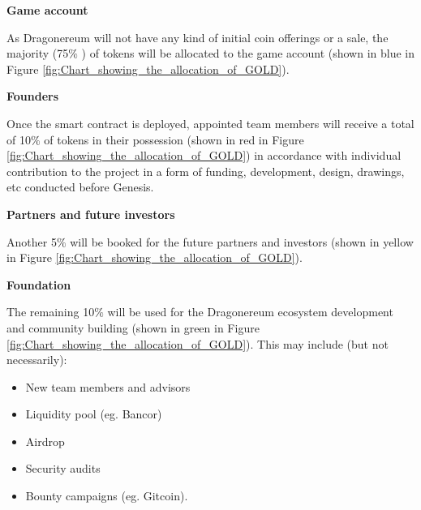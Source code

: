 \documentclass[12pt]{article}
\begin{document}


\textbf{Game account}\par

As Dragonereum will not have any kind of initial coin offerings or a sale, the majority (75$\%$ ) of tokens will be allocated to the game account (shown in blue in Figure \ref{fig:Chart_showing_the_allocation_of_GOLD}).\par

\textbf{Founders}\par

Once the smart contract is deployed, appointed team members will receive a total of 10$\%$ of tokens in their possession (shown in red in Figure \ref{fig:Chart_showing_the_allocation_of_GOLD}) in accordance with individual contribution to the project in a form of funding, development, design, drawings, etc conducted before Genesis.\par

\textbf{Partners and future investors}\par

Another 5$\%$ will be booked for the future partners and investors (shown in yellow in Figure \ref{fig:Chart_showing_the_allocation_of_GOLD}).\par

\textbf{Foundation}\par

The remaining 10$\%$  will be used for the Dragonereum ecosystem development and community building (shown in green in Figure \ref{fig:Chart_showing_the_allocation_of_GOLD}). This may include (but not necessarily):\par

\begin{itemize}
	\item New team members and advisors\par

	\item Liquidity pool (eg. Bancor)\par

	\item Airdrop\par

	\item Security audits\par

	\item Bounty campaigns (eg. Gitcoin).
\end{itemize}\par
\end{document}
